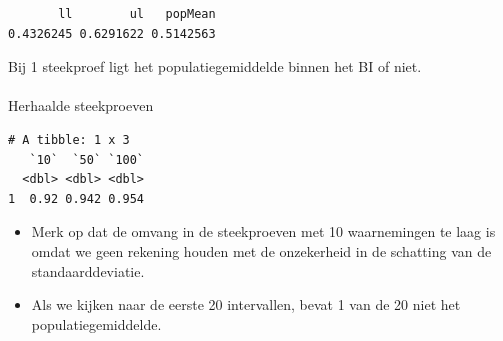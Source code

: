 \documentclass[
  dutch,
  letterpaper,
  12pt]{book}
\makeatletter
\let\oldparagraph\paragraph
\renewcommand{\paragraph}{
    \@ifstar
      \xxxParagraphStar
      \xxxParagraphNoStar
  }
\newcommand{\xxxParagraphStar}[1]{\oldparagraph*{#1}\mbox{}}
\newcommand{\xxxParagraphNoStar}[1]{\oldparagraph{#1}\mbox{}}
\newenvironment{Shaded}{\begin{snugshade}}{\end{snugshade}}
\newcommand{\AttributeTok}[1]{\textcolor[rgb]{0.40,0.45,0.13}{#1}}
\newcommand{\FloatTok}[1]{\textcolor[rgb]{0.68,0.00,0.00}{#1}}
\newcommand{\FunctionTok}[1]{\textcolor[rgb]{0.28,0.35,0.67}{#1}}
\newcommand{\NormalTok}[1]{\textcolor[rgb]{0.00,0.23,0.31}{#1}}
\newcommand{\OtherTok}[1]{\textcolor[rgb]{0.00,0.23,0.31}{#1}}
\newcommand{\SpecialCharTok}[1]{\textcolor[rgb]{0.37,0.37,0.37}{#1}}
\theoremstyle{definition}
\theoremstyle{definition}
\theoremstyle{definition}
\theoremstyle{remark}
\makeatother
\begin{document}
\begin{verbatim}
       ll        ul   popMean 
0.4326245 0.6291622 0.5142563 
\end{verbatim}

Bij 1 steekproef ligt het populatiegemiddelde binnen het BI of niet.

\paragraph{Herhaalde steekproeven}\label{herhaalde-steekproeven}

\begin{Shaded}
\end{Shaded}

\begin{verbatim}
# A tibble: 1 x 3
   `10`  `50` `100`
  <dbl> <dbl> <dbl>
1  0.92 0.942 0.954
\end{verbatim}

\begin{itemize}
\item
  Merk op dat de omvang in de steekproeven met 10 waarnemingen te laag
  is omdat we geen rekening houden met de onzekerheid in de schatting
  van de standaarddeviatie.
\item
  Als we kijken naar de eerste 20 intervallen, bevat 1 van de 20 niet
  het populatiegemiddelde.
\end{itemize}
\end{document}
